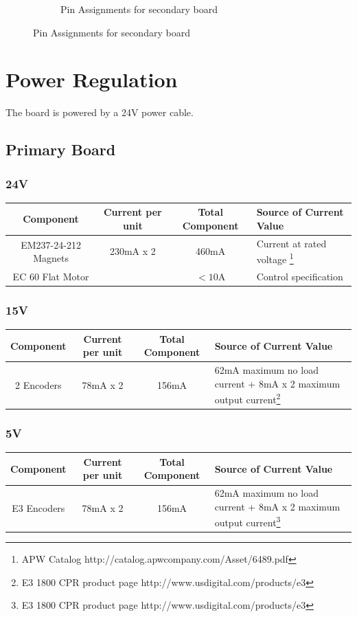 \documentclass{article}
\begin{document}
\begin{figure}[h!]
\begin{subfigure}{0.4\textwidth}
		\caption{Pin Assignments for secondary board}
		\label{pinout2}
	\end{subfigure}
\end{figure}

\section{Power Regulation}
The board is powered by a 24V power cable. 
\subsection{Primary Board}
\subsubsection*{24V}
\begin{longtable}{|c | c | c |  >{\centering\arraybackslash}p{} |} \hline
Component & Current per unit & Total Component & Source of Current Value\\ \hline
EM237-24-212 Magnets & 230mA x 2 & 460mA & Current at rated voltage \footnote{APW Catalog http://catalog.apwcompany.com/Asset/6489.pdf}\\ \hline
EC 60 Flat Motor & & $<10$A & Control specification\\ \hline
\end{longtable}
\subsubsection*{15V}
\begin{longtable}{|c | c | c |  >{\centering\arraybackslash}p{} |} \hline
Component & Current per unit & Total Component & Source of Current Value\\ \hline
2 Encoders & 78mA x 2 & 156mA & 62mA maximum no load current + 8mA x 2 maximum output current\footnote{E3 1800 CPR product page http://www.usdigital.com/products/e3}\\ \hline
\end{longtable}
\subsubsection*{5V}
\begin{longtable}{|c | c | c |  >{\centering\arraybackslash}p{} |} \hline
Component & Current per unit & Total Component & Source of Current Value\\ \hline
E3 Encoders & 78mA x 2 & 156mA & 62mA maximum no load current + 8mA x 2 maximum output current\footnote{E3 1800 CPR product page http://www.usdigital.com/products/e3}\\ \hline
\end{longtable}
\end{document}
